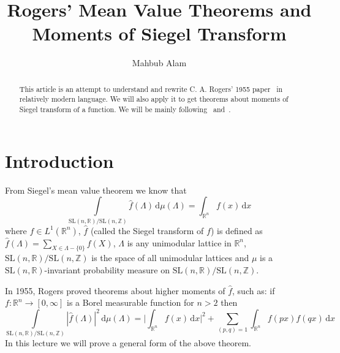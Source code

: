 \documentclass[11pt]{article}
\theoremstyle{definition}
\theoremstyle{proof}
\begin{document}
\title{\bfseries Rogers' Mean Value Theorems and Moments of Siegel Transform}

\author{Mahbub Alam}
\date{}

\maketitle

\begin{abstract}
    This article is an attempt to understand and rewrite C. A. Rogers' 1955 paper~\cite{rogers55b} in relatively modern language.
    We will also apply it to get theorems about moments of Siegel transform of a function.
    We will be mainly following~\cite{rogers55b} and~\cite{schmidt58}.
\end{abstract}

\section{Introduction}
From Siegel's mean value theorem we know that
\[
    \int\limits_{\mathrm{SL}(n,\mathbb{R}) / \mathrm{SL}(n,\mathbb{Z})} \widehat{f}(\Lambda  ) \, \mathrm{d} \mu (\Lambda  ) = \int_{\mathbb{R}^n}f(x) \, \mathrm{d} x
\]
where $f\in L^1(\mathbb{R}^n )$, $\widehat{f}$ (called the Siegel transform of $f$) is defined as $\widehat{f}( \Lambda ) = \displaystyle\sum_{X \in \Lambda - \{0\}} f(X)$, $\Lambda$ is any unimodular lattice in $\mathbb{R}^{n}$, $\mathrm{SL}(n, \mathbb{R})/ \mathrm{SL}(n, \mathbb{Z})$ is the space of all unimodular lattices and $\mu$ is a $\mathrm{SL}(n,\mathbb{R})$-invariant probability measure on $\mathrm{SL}(n,\mathbb{R})/\mathrm{SL}(n,\mathbb{Z})$.

In 1955, Rogers proved theorems about higher moments of $\widehat{f}$, such as: if $f : \mathbb{R}^{n} \to [0, \infty]$ is a Borel measurable function for $n > 2$ then
\[
    \int\limits_{\mathrm{SL}(n,\mathbb{R})/\mathrm{SL}(n,\mathbb{Z})} |\widehat{f}(\Lambda )|^2 \, \mathrm{d} \mu(\Lambda ) = \bigg|\int_{\mathbb{R}^{n}}f(x) \, \mathrm{d} x\bigg|^2 + \displaystyle\sum_{(p,q)=1}\int_{\mathbb{R}^{n}}f(px)f(qx) \, \mathrm{d} x
\]
In this lecture we will prove a general form of the above theorem.
\end{document}
